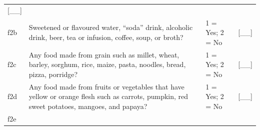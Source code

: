 \documentclass[12pt,a4paper]{book}
\theoremstyle{definition}
\theoremstyle{definition}
\theoremstyle{definition}
\theoremstyle{remark}
\begin{document}
\begin{longtable}[]{@{}llll@{}}
\begin{minipage}[t]{0.13\columnwidth}
{[}\_\_{]}\strut
\end{minipage}\tabularnewline
\begin{minipage}[t]{0.09\columnwidth}\raggedright
f2b\strut
\end{minipage} & \begin{minipage}[t]{0.41\columnwidth}\raggedright
Sweetened or flavoured water, ``soda'' drink, alcoholic drink, beer, tea
or infusion, coffee, soup, or broth?\strut
\end{minipage} & \begin{minipage}[t]{0.25\columnwidth}\raggedright
1 = Yes; 2 = No\strut
\end{minipage} & \begin{minipage}[t]{0.13\columnwidth}\raggedright
{[}\_\_{]}\strut
\end{minipage}\tabularnewline
\begin{minipage}[t]{0.09\columnwidth}\raggedright
f2c\strut
\end{minipage} & \begin{minipage}[t]{0.41\columnwidth}\raggedright
Any food made from grain such as millet, wheat, barley, sorghum, rice,
maize, pasta, noodles, bread, pizza, porridge?\strut
\end{minipage} & \begin{minipage}[t]{0.25\columnwidth}\raggedright
1 = Yes; 2 = No\strut
\end{minipage} & \begin{minipage}[t]{0.13\columnwidth}\raggedright
{[}\_\_{]}\strut
\end{minipage}\tabularnewline
\begin{minipage}[t]{0.09\columnwidth}\raggedright
f2d\strut
\end{minipage} & \begin{minipage}[t]{0.41\columnwidth}\raggedright
Any food made from fruits or vegetables that have yellow or orange flesh
such as carrots, pumpkin, red sweet potatoes, mangoes, and papaya?\strut
\end{minipage} & \begin{minipage}[t]{0.25\columnwidth}\raggedright
1 = Yes; 2 = No\strut
\end{minipage} & \begin{minipage}[t]{0.13\columnwidth}\raggedright
{[}\_\_{]}\strut
\end{minipage}\tabularnewline
\begin{minipage}[t]{0.09\columnwidth}\raggedright
f2e\strut
\end{minipage} & \begin{minipage}[t]{0.41\columnwidth}\raggedright

\end{minipage}
\end{longtable}
\end{document}
